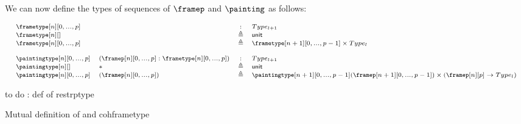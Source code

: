\documentclass{msc}
\newcommand{\unittype}{\ensuremath{\mathsf{unit}}}
\newcommand{\unitpoint}{\ensuremath{\ast}}
\newcommand{\defeq}{\ensuremath{\triangleq}}
\begin{document}
We can now define the types of sequences of $\framep$ and $\painting$ as follows:

\begin{equation*}
  \fontsize{7.2}{9}\selectfont
  \begin{array}{llcl}
    \frametype[n][0,...,p]    &                                              & :      & Type_{l+1}                                                                                       \\
    \frametype[n][]           &                                              & \defeq & \unittype                                                                                        \\
    \frametype[n][0,...,p]    &                                              & \defeq & \frametype[n+1][0,...,p-1] \times Type_l                                                         \\
    \\
    \paintingtype[n][0,...,p] & (\framep[n][0,...,p]:\frametype[n][0,...,p]) & :      & Type_{l+1}                                                                                       \\
    \paintingtype[n][]        & \unitpoint                                   & \defeq & \unittype                                                                                        \\
    \paintingtype[n][0,...,p] & (\framep[n][0,...,p])                        & \defeq & \paintingtype[n+1][0,...,p-1](\framep[n+1][0,...,p-1]) \times (\framep[n][p] \rightarrow Type_l) \\
  \end{array}
\end{equation*}

to do : def of restrptype

Mutual definition of \restrf and cohframetype
\end{document}
